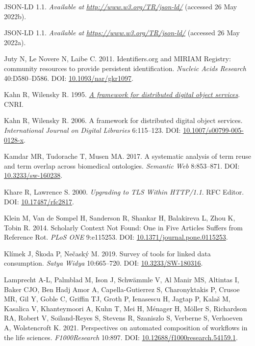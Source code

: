 \begin{CSLReferences}{1}{0}
\leavevmode{}%
JSON-LD 1.1. \emph{Available at} \href{http://www.w3.org/TR/json-ld/}{\emph{http://www.w3.org/TR/json-ld/}} (accessed 26 May 2022b).

\leavevmode{}%
JSON-LD 1.1. \emph{Available at} \href{https://www.w3.org/TR/json-ld/}{\emph{https://www.w3.org/TR/json-ld/}} (accessed 26 May 2022a).

\leavevmode{}%
Juty N, Le Novere N, Laibe C. 2011. Identifiers.org and MIRIAM Registry: community resources to provide persistent identification. \emph{Nucleic Acids Research} 40:D580--D586. DOI: \href{https://doi.org/10.1093/nar/gkr1097}{10.1093/nar/gkr1097}.

\leavevmode{}%
Kahn R, Wilensky R. 1995. \emph{\href{http://www.cnri.reston.va.us/k-w.html}{A framework for distributed digital object services}}. CNRI.

\leavevmode{}%
Kahn R, Wilensky R. 2006. A framework for distributed digital object services. \emph{International Journal on Digital Libraries} 6:115--123. DOI: \href{https://doi.org/10.1007/s00799-005-0128-x}{10.1007/s00799-005-0128-x}.

\leavevmode{}%
Kamdar MR, Tudorache T, Musen MA. 2017. A systematic analysis of term reuse and term overlap across biomedical ontologies. \emph{Semantic Web} 8:853--871. DOI: \href{https://doi.org/10.3233/sw-160238}{10.3233/sw-160238}.

\leavevmode{}%
Khare R, Lawrence S. 2000. \emph{Upgrading to TLS Within HTTP/1.1}. RFC Editor. DOI: \href{https://doi.org/10.17487/rfc2817}{10.17487/rfc2817}.

\leavevmode{}%
Klein M, Van de Sompel H, Sanderson R, Shankar H, Balakireva L, Zhou K, Tobin R. 2014. Scholarly Context Not Found: One in Five Articles Suffers from Reference Rot. \emph{PLoS ONE} 9:e115253. DOI: \href{https://doi.org/10.1371/journal.pone.0115253}{10.1371/journal.pone.0115253}.

\leavevmode{}%
Klímek J, Škoda P, Nečaský M. 2019. Survey of tools for linked data consumption. \emph{Satya Widya} 10:665--720. DOI: \href{https://doi.org/10.3233/SW-180316}{10.3233/SW-180316}.

\leavevmode{}%
Lamprecht A-L, Palmblad M, Ison J, Schwämmle V, Al Manir MS, Altintas I, Baker CJO, Ben Hadj Amor A, Capella-Gutierrez S, Charonyktakis P, Crusoe MR, Gil Y, Goble C, Griffin TJ, Groth P, Ienasescu H, Jagtap P, Kalaš M, Kasalica V, Khanteymoori A, Kuhn T, Mei H, Ménager H, Möller S, Richardson RA, Robert V, Soiland-Reyes S, Stevens R, Szaniszlo S, Verberne S, Verhoeven A, Wolstencroft K. 2021. Perspectives on automated composition of workflows in the life sciences. \emph{F1000Research} 10:897. DOI: \href{https://doi.org/10.12688/f1000research.54159.1}{10.12688/f1000research.54159.1}.


\end{CSLReferences}
